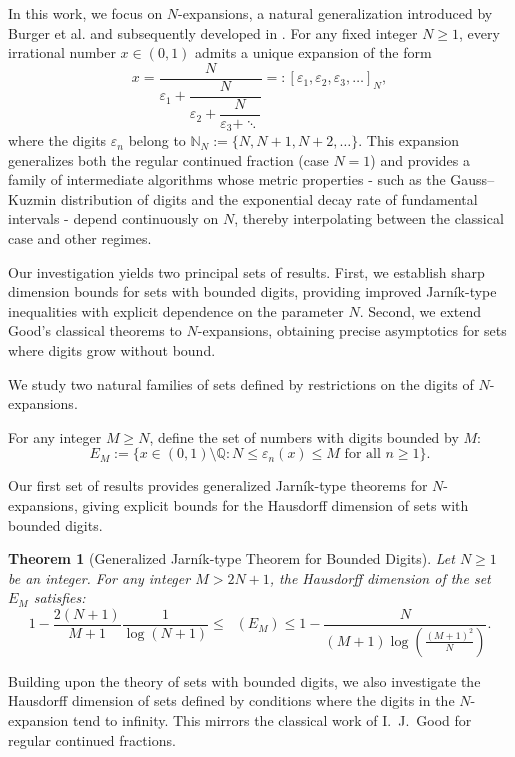 \documentclass[12pt]{article}
\newtheorem{theorem}{Theorem}[section]
\newcommand{\Q}{\mathbb{Q}}
\numberwithin{equation}{section}
\DeclareMathOperator{\dimH}{dim_H}
\begin{document}
In this work, we focus on $N$-expansions, a natural generalization introduced by Burger et al. \cite{Burger2008} and subsequently developed in \cite{Lascu2016, Lascu2017, SebeLascu2020}. For any fixed integer $N \geq 1$, every irrational number $x \in (0,1)$ admits a unique expansion of the form
\[
x = \frac{N}{\varepsilon_1 + \dfrac{N}{\varepsilon_2 + \dfrac{N}{\varepsilon_3 + \ddots}}} =: [\varepsilon_1, \varepsilon_2, \varepsilon_3, \ldots]_N,
\]
where the digits $\varepsilon_n$ belong to $\mathbb{N}_N := \{N, N+1, N+2, \ldots\}$. This expansion generalizes both the regular continued fraction (case $N=1$) and provides a family of intermediate algorithms {whose metric properties - such as the Gauss–Kuzmin distribution of digits and the exponential decay rate of fundamental intervals - depend continuously on $N$, thereby interpolating between the classical case and other regimes.}

Our investigation yields two principal sets of results. First, we establish sharp dimension bounds for sets with bounded digits, providing improved Jarn\'ik-type inequalities with explicit dependence on the parameter $N$. Second, we extend Good's classical theorems \cite{Good1941} to $N$-expansions, obtaining precise asymptotics for sets where digits grow without bound.

We study two natural families of sets defined by restrictions on the digits of $N$-expansions.

 
For any integer $M \geq N$, define the set of numbers with digits bounded by $M$:
\begin{equation}
E_M := \{ x \in (0,1) \setminus \Q : N \leq \varepsilon_n(x) \leq M \text{ for all } n \geq 1 \}.  \label{def:EM}
\end{equation}

Our first set of results provides generalized Jarn\'ik-type theorems for $N$-expansions, giving explicit bounds for the Hausdorff dimension of sets with bounded digits.

\begin{theorem}[Generalized Jarn\'ik-type Theorem for Bounded Digits] \label{thm:main-bounded}
Let $N \geq 1$ be an integer. For any integer $M > 2N+1$, the Hausdorff dimension of the set $E_M$
satisfies:
\[
 1 - \frac{2(N+1)}{M+1}\frac{1}{\log(N+1)}
 \leq 
 \dimH(E_M) 
 \leq 
 1 - \frac{N}{(M + 1)\log \left( \frac{(M+1)^2}{N} \right)}.
\]
\end{theorem}


Building upon the theory of sets with bounded digits, we also investigate the Hausdorff dimension of sets defined by conditions where the digits in the $N$-expansion tend to infinity. This mirrors the classical work of I.~J.~Good \cite{Good1941} for regular continued fractions.
\end{document}
